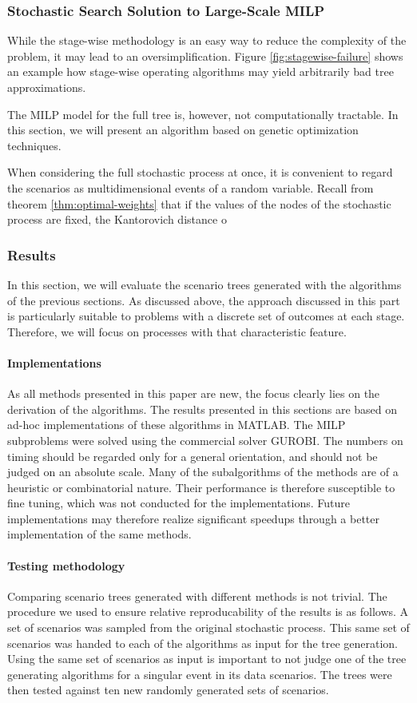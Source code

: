 \subsubsection{Stochastic Search Solution to Large-Scale MILP}
While the stage-wise methodology is an easy way to reduce the complexity of the problem, it may lead to an oversimplification.
Figure \ref{fig:stagewise-failure} shows an example how stage-wise operating algorithms may yield arbitrarily bad tree approximations. 

The MILP model for the full tree is, however, not computationally tractable.
In this section, we will present an algorithm based on genetic optimization techniques. 

When considering the full stochastic process at once, it is convenient to regard the scenarios as multidimensional events of a random variable. 
Recall from theorem \ref{thm:optimal-weights} that if the values of the nodes of the stochastic process are fixed, the Kantorovich distance o
\subsubsection{Results}
In this section, we will evaluate the scenario trees generated with the algorithms of the previous sections.
As discussed above, the approach discussed in this part is particularly suitable to problems with a discrete set of outcomes at each stage.
Therefore, we will focus on processes with that characteristic feature.
%
\paragraph{Implementations}
As all methods presented in this paper are new, the focus clearly lies on the derivation of the algorithms.
The results presented in this sections are based on ad-hoc implementations of these algorithms in MATLAB.
The MILP subproblems were solved using the commercial solver GUROBI.
The numbers on timing should be regarded only for a general orientation, and should not be judged on an absolute scale.
Many of the subalgorithms of the methods are of a heuristic or combinatorial nature.
Their performance is therefore susceptible to fine tuning, which was not conducted for the implementations.
Future implementations may therefore realize significant speedups through a better implementation of the same methods.
%
\paragraph{Testing methodology} 
Comparing scenario trees generated with different methods is not trivial.
The procedure we used to ensure relative reproducability of the results is as follows.
A set of scenarios was sampled from the original stochastic process.
This same set of scenarios was handed to each of the algorithms as input for the tree generation.
Using the same set of scenarios as input is important to not judge one of the tree generating algorithms for a singular event in its data scenarios.
The trees were then tested against ten new randomly generated sets of scenarios.

